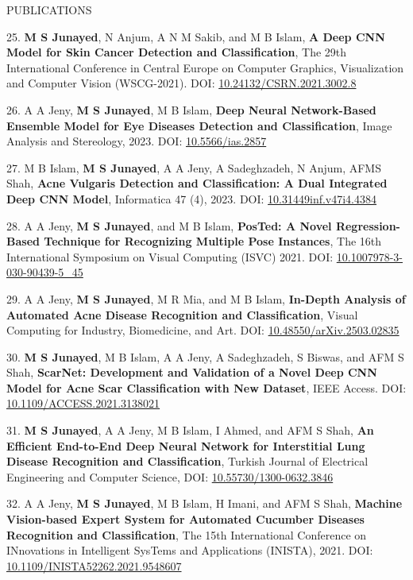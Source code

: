 \begin{rSection}{ PUBLICATIONS}
{{{{{25. {\bf M S Junayed}, N Anjum, A N M Sakib, and M B Islam, {\bf{A Deep CNN Model for Skin Cancer Detection and Classification}}, The 29th International Conference in Central Europe on Computer Graphics, Visualization and Computer Vision (WSCG-2021). DOI: {\href{http://wscg.zcu.cz/WSCG2021/FULL/I02.pdf}{10.24132/CSRN.2021.3002.8}}
}

{26. A A Jeny, {\bf M S Junayed}, M B Islam, 
{\bf{Deep Neural Network-Based Ensemble Model for Eye Diseases Detection and Classification}}, 
Image Analysis and Stereology, 2023. DOI: {\href{https://www.ias-iss.org/ojs/IAS/article/view/2857}{10.5566/ias.2857}}

{27. M B Islam, {\bf M S Junayed}, A A Jeny, A Sadeghzadeh, N Anjum, AFMS Shah, 
{\bf{Acne Vulgaris Detection and Classification: A Dual Integrated Deep CNN Model}}, 
Informatica 47 (4), 2023. DOI: {\href{https://informatica.si/index.php/informatica/article/view/4384}{10.31449\/inf.v47i4.4384}}}

{28. A A Jeny, {\bf M S Junayed}, and M B Islam, {\bf{PosTed: A Novel Regression-Based Technique for Recognizing Multiple Pose Instances}}, The 16th International Symposium on Visual Computing (ISVC) 2021. DOI: {\href{https://link.springer.com/chapter/10.1007/978-3-030-90439-5_45}{10.1007\/978-3-030-90439-5\_45}}}

{29. A A Jeny, {\bf M S Junayed}, M R Mia, and M B Islam, {\bf{In-Depth Analysis of Automated Acne Disease Recognition and Classification}}, Visual Computing for Industry, Biomedicine, and Art. DOI: {\href{https://arxiv.org/abs/2503.02835}{10.48550/arXiv.2503.02835}}}

{30. {\bf M S Junayed}, M B Islam,  A A Jeny, A Sadeghzadeh, S Biswas, and AFM S Shah, {\bf{ScarNet: Development and Validation of a Novel Deep CNN Model for Acne Scar Classification with New Dataset}}, IEEE Access. DOI: {\href{https://ieeexplore.ieee.org/document/9661390}{10.1109/ACCESS.2021.3138021}}}

{31. {\bf M S Junayed}, A A Jeny, M B Islam, I Ahmed, and  AFM S Shah, {\bf{An Efficient End-to-End Deep Neural Network for Interstitial Lung Disease Recognition and Classification}}, Turkish Journal of Electrical Engineering and Computer Science, DOI: {\href{https://journals.tubitak.gov.tr/elektrik/vol30/iss4/6/}{10.55730/1300-0632.3846}}}

{32. A A Jeny, {\bf M S Junayed}, M B Islam, H Imani, and AFM S Shah, {\bf{Machine Vision-based Expert System for Automated Cucumber Diseases Recognition and Classification}}, The 15th International Conference on INnovations in Intelligent SysTems and Applications (INISTA), 2021. DOI: {\href{https://ieeexplore.ieee.org/abstract/document/9548607}{10.1109/INISTA52262.2021.9548607}}}

}}}}}
\end{rSection}
